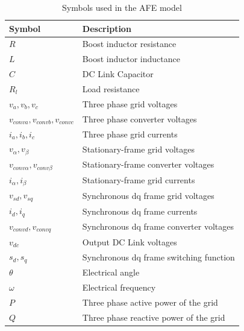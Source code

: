 \begin{table}[H]

\centering

\caption{Symbols used in the AFE model}

\label{tab:spmsm-notation-narrative}

\begin{tabular}{ll}

\hline

Symbol & Description \\

\hline

$R$ & Boost inductor resistance \\

$L$ &   Boost inductor inductance \\

$C$ &   DC Link Capacitor \\

$R_l$ & Load resistance \\

$v_a, v_b, v_c$ & Three phase grid voltages \\

$v_{conva}, v_{convb}, v_{convc}$ & Three phase converter voltages \\

$i_a, i_b, i_c$ & Three phase grid currents \\

$v_\alpha, v_\beta$ & Stationary-frame grid voltages \\

$v_{conv\alpha}, v_{conv\beta}$ & Stationary-frame converter voltages \\

$i_\alpha, i_\beta$ & Stationary-frame grid currents \\

$v_{sd}, v_{sq}$ & Synchronous dq frame grid voltages \\

$i_d, i_q$ & Synchronous dq frame currents \\

$v_{convd}, v_{convq}$ & Synchronous dq frame converter voltages \\

$v_{dc}$ & Output DC Link voltages \\

$s_d, s_q$ & Synchronous dq frame switching function \\

$\theta$ & Electrical angle \\

$\omega$ & Electrical frequency \\

$P$ & Three phase active power of the grid \\

$Q$ & Three phase reactive power of the grid \\



\hline

\end{tabular}

\end{table}



